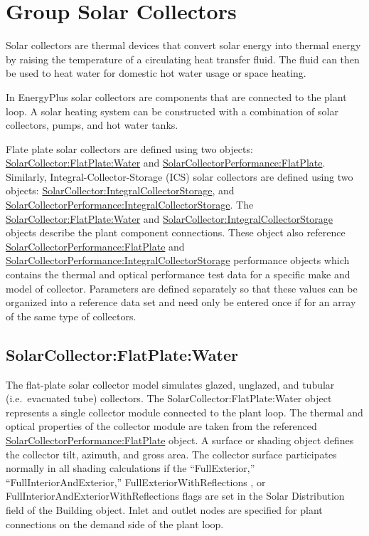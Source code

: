 \section{Group Solar Collectors}\label{group-solar-collectors}

Solar collectors are thermal devices that convert solar energy into thermal energy by raising the temperature of a circulating heat transfer fluid. The fluid can then be used to heat water for domestic hot water usage or space heating.

In EnergyPlus solar collectors are components that are connected to the plant loop. A solar heating system can be constructed with a combination of solar collectors, pumps, and hot water tanks.

Flate plate solar collectors are defined using two objects: \hyperref[solarcollectorflatplatewater]{SolarCollector:FlatPlate:Water} and \hyperref[solarcollectorperformanceflatplate]{SolarCollectorPerformance:FlatPlate}. Similarly, Integral-Collector-Storage (ICS) solar collectors are defined using two objects: \hyperref[solarcollectorintegralcollectorstorage]{SolarCollector:IntegralCollectorStorage}, and \hyperref[solarcollectorperformanceintegralcollectorstorage]{SolarCollectorPerformance:IntegralCollectorStorage}. The \hyperref[solarcollectorflatplatewater]{SolarCollector:FlatPlate:Water} and \hyperref[solarcollectorintegralcollectorstorage]{SolarCollector:IntegralCollectorStorage} objects describe the plant component connections. These object also reference \hyperref[solarcollectorperformanceflatplate]{SolarCollectorPerformance:FlatPlate} and \hyperref[solarcollectorperformanceintegralcollectorstorage]{SolarCollectorPerformance:IntegralCollectorStorage} performance objects which contains the thermal and optical performance test data for a specific make and model of collector. Parameters are defined separately so that these values can be organized into a reference data set and need only be entered once if for an array of the same type of collectors.

\subsection{SolarCollector:FlatPlate:Water}\label{solarcollectorflatplatewater}

The flat-plate solar collector model simulates glazed, unglazed, and tubular (i.e.~evacuated tube) collectors. The SolarCollector:FlatPlate:Water object represents a single collector module connected to the plant loop. The thermal and optical properties of the collector module are taken from the referenced \hyperref[solarcollectorperformanceflatplate]{SolarCollectorPerformance:FlatPlate} object. A surface or shading object defines the collector tilt, azimuth, and gross area. The collector surface participates normally in all shading calculations if the ``FullExterior,'' ``FullInteriorAndExterior,'' FullExteriorWithReflections , or FullInteriorAndExteriorWithReflections flags are set in the Solar Distribution field of the Building object. Inlet and outlet nodes are specified for plant connections on the demand side of the plant loop.

